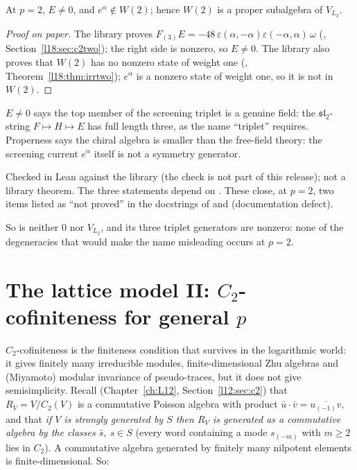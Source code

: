 \begin{theorem}\label{l18:thm:Ene0}
At $p=2$, $E\ne0$, and $e^\alpha\notin W(2)$; hence $W(2)$ is a proper subalgebra of $V_{L_2}$.
\end{theorem}
\begin{proof}[Proof on paper]
The library proves $F_{(3)}E=-48\,\varepsilon(\alpha,-\alpha)\varepsilon(-\alpha,\alpha)\,\omega$
(, Section~\ref{l18:sec:c2two}); the right side is nonzero, so
$E\ne0$. The library also proves that $W(2)$ has no nonzero state of weight one
(, Theorem~\ref{l18:thm:irrtwo}); $e^\alpha$ is a nonzero
state of weight one, so it is not in $W(2)$.
\end{proof}
\begin{physics}
$E\ne0$ says the top member of the screening triplet is a genuine field: the $\mathfrak{sl}_2$-string
$F\mapsto H\mapsto E$ has full length three, as the name ``triplet'' requires. Properness says the chiral algebra is
smaller than the free-field theory: the screening current $e^\alpha$ itself is not a symmetry generator.
\end{physics}
\begin{status}
Checked in Lean against the library (the check is not part of this release); not a library theorem. The three statements depend on
. These close, at $p=2$, two items listed as ``not
proved'' in the docstrings of  and 
(documentation defect).
\end{status}
\begin{remark}\label{l18:cor:proper}
So  is neither $0$ nor $V_{L_2}$, and its three triplet generators are nonzero: none of the
degeneracies that would make the name misleading occurs at $p=2$.
\end{remark}

\section{The lattice model II: \texorpdfstring{$C_2$}{C2}-cofiniteness for general \texorpdfstring{$p$}{p}}\label{l18:sec:c2general}

$C_2$-cofiniteness is the finiteness condition that survives in the logarithmic world: it gives
finitely many irreducible modules, finite-dimensional Zhu algebras and (Miyamoto) modular invariance
of pseudo-traces, but it does not give semisimplicity. Recall (Chapter~\ref{ch:L12},
Section~\ref{l12:sec:c2}) that $R_V=V/C_2(V)$ is a commutative Poisson algebra with product
$\bar u\cdot\bar v=\overline{u_{(-1)}v}$, and that \emph{if $V$ is strongly generated by $S$ then $R_V$ is
generated as a commutative algebra by the classes $\bar s$, $s\in S$} (every word containing a mode
$s_{(-m)}$ with $m\ge2$ lies in $C_2$). A commutative algebra generated by finitely many nilpotent
elements is finite-dimensional. So:

